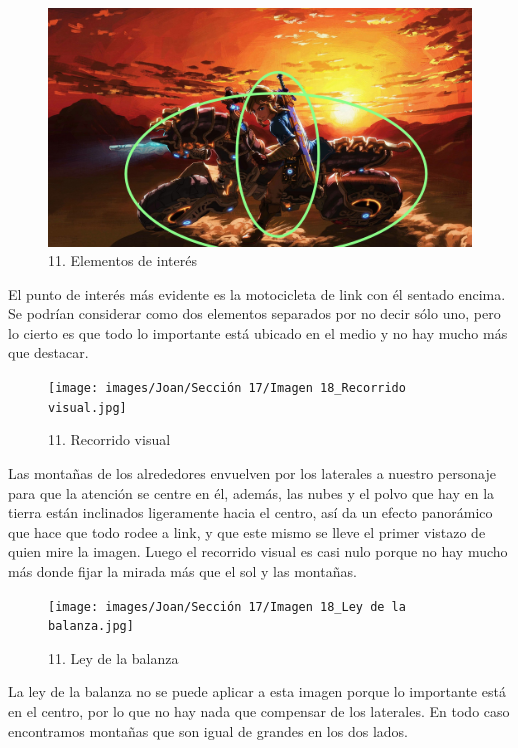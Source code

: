 \documentclass[12pt]{article}
\begin{document}
        \begin{figure}[H]
          \centering
          \includegraphics[scale=0.35]{images/Joan/Sección 17/Imagen 18_Elementos de interés.jpg}
          \caption{\small 11. Elementos de interés}
        \end{figure}
        El punto de interés más evidente es la motocicleta de link con él sentado encima. Se podrían considerar como dos elementos separados por no decir sólo uno, pero lo cierto es que todo lo importante está ubicado en el medio y no hay mucho más que destacar. 

        \begin{figure}[H]
          \centering
          \texttt{[image: images/Joan/Sección 17/Imagen 18\_Recorrido visual.jpg]}
          \caption{\small 11. Recorrido visual}
        \end{figure}
        Las montañas de los alrededores envuelven por los laterales a nuestro personaje para que la atención se centre en él, además, las nubes y el polvo que hay en la tierra están inclinados ligeramente hacia el centro, así da un efecto panorámico que hace que todo rodee a link, y que este mismo se lleve el primer vistazo de quien mire la imagen. 
    Luego el recorrido visual es casi nulo porque no hay mucho más donde fijar la mirada más que el sol y las montañas. 

    \begin{figure}[H]
          \centering
          \texttt{[image: images/Joan/Sección 17/Imagen 18\_Ley de la balanza.jpg]}
          \caption{\small 11. Ley de la balanza}
        \end{figure}
        La ley de la balanza no se puede aplicar a esta imagen porque lo importante está en el centro, por lo que no hay nada que compensar de los laterales. En todo caso encontramos montañas que son igual de grandes en los dos lados. 
\end{document}
